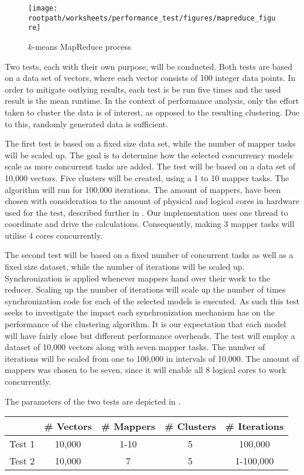 \begin{figure}
\centering
\texttt{[image: \\rootpath/worksheets/performance\_test/figures/mapreduce\_figure]}
\caption{$k$-means MapReduce process}\label{fig:kmeans_mapreduce}
\end{figure}

Two tests, each with their own purpose, will be conducted. Both tests are  based on a data set of vectors, where each vector consists of 100 integer data points. In order to mitigate outlying results, each test is be run five times and the used result is the mean runtime. In the context of performance analysis, only the effort taken to cluster the data is of interest, as opposed to the resulting clustering. Due to this, randomly generated data is sufficient.

The first test is based on a fixed size data set, while the number of mapper tasks will be scaled up. The goal is to determine how the selected concurrency models scale as more concurrent tasks are added. The test will be based on a data set of 10,000 vectors. Five clusters will be created, using a 1 to 10 mapper tasks. The algorithm will run for 100,000 iterations. The amount of mappers, have been chosen with consideration to the amount of physical and logical cores in hardware used for the test, described further in . Our implementation uses one thread to coordinate and drive the calculations. Consequently, making 3 mapper tasks will utilise 4 cores concurrently.

The second test will be based on a fixed number of concurrent tasks as well as a fixed size dataset, while the number of iterations will be scaled up.  Synchronization is applied whenever mappers hand over their work to the reducer. Scaling up the number of iterations will scale up the number of times synchronization code for each of the selected models is executed. As such this test seeks to investigate the impact each synchronization mechanism has on the performance of the clustering algorithm. It is our expectation that each model will have fairly close but different performance overheads. The test will employ a dataset of 10,000 vectors along with seven mapper tasks. The number of iterations will be scaled from one to 100,000 in intervals of 10,000. The amount of mappers was chosen to be seven, since it will enable all 8 logical cores to work concurrently.

The parameters of the two tests are depicted in .

\begin{center}
\begin{table}[h]
\centering
\begin{tabular}{c|cccc}
       & \# Vectors        & \# Mappers			 	& \# Clusters & \# Iterations \\ \hline
Test 1 & 10,000            & 1-10        			& 5           & 100,000      \\
Test 2 & 10,000			   & 7          			& 5           & 1-100,000
\end{tabular}
\end{table}
 \label{tab:test_description} 
\end{center}

